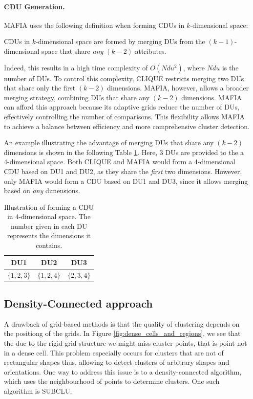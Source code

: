 \paragraph{CDU Generation.}
MAFIA uses the following definition when forming CDUs in $k$-dimensional space:
\begin{definition}
    CDUs in $k$-dimensional space are formed by merging DUs from the $(k-1)$-dimensional space that share \textit{any} $(k-2)$ attributes.
\end{definition}
Indeed, this results in a high time complexity of $O(Ndu^2)$, where $Ndu$ is the number of DUs. To control this complexity, CLIQUE restricts merging two DUs that share only the first $(k-2)$ dimensions. MAFIA, however, allows a broader merging strategy, combining DUs that share any $(k-2)$ dimensions. MAFIA can afford this approach because its adaptive grids reduce the number of DUs, effectively controlling the number of comparisons. This flexibility allows MAFIA to achieve a balance between efficiency and more comprehensive cluster detection.

An example illustrating the advantage of merging DUs that share any $(k-2)$ dimensions is shown in the following Table \ref{tab:cdu}. Here, 3 DUs are provided to the a 4-dimensional space. Both CLIQUE and MAFIA would form a 4-dimensional CDU based on DU1 and DU2, as they share the \textit{first} two dimensions. However, only MAFIA would form a CDU based on DU1 and DU3, since it allows merging based on \textit{any} dimensions.
\begin{table}[H]
    \vspace*{-0.5cm}
    \centering
    \begin{tabular}{|c|c|c|}
        \hline
        DU1 & DU2 & DU3 \\
        \hline
        $\{1, 2, 3\}$ & $\{1, 2, 4\}$ & $\{2, 3, 4\}$ \\
        \hline
    \end{tabular}
    \vspace*{0.2cm}
    \caption{Illustration of forming a CDU in 4-dimensional space. The number given in each DU represents the dimensions it contains.}
    \label{tab:cdu}
    \vspace*{-0.5cm}
\end{table}

\subsection{Density-Connected approach}
A drawback of grid-based methods is that the quality of clustering depends on the positiong of the grids. In Figure \ref{fig:dense_cells_and_regions}, we see that the due to the rigid grid structure we might miss cluster points, that is point not in a dense cell. This problem especially occurs for clusters that are not of rectangular shapes thus, allowing to detect clusters of arbitrary shapes and orientations. One way to address this issue is to a density-connected algorithm, which uses the neighbourhood of points to determine clusters. One such algorithm is SUBCLU.

